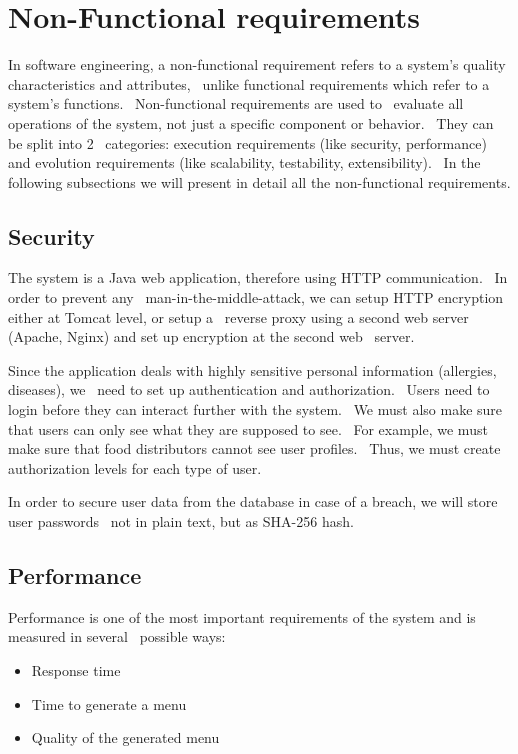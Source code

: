 \section{Non-Functional requirements}
\label{sec:specification-non-functional}
In software engineering, a non-functional requirement refers to a system's quality characteristics and attributes, \
unlike functional requirements which refer to a system's functions. \
Non-functional requirements are used to \
evaluate all operations of the system, not just a specific component or behavior. \
They can be split into 2 \
categories: execution requirements (like security, performance) and evolution requirements (like scalability,
testability, extensibility). \
In the following subsections we will present in detail all the non-functional requirements.

\subsection{Security}
\label{subsec:specification-security}
The system is a Java web application, therefore using HTTP communication. \
In order to prevent any \
man-in-the-middle-attack, we can setup HTTP encryption either at Tomcat level, or setup a \
reverse proxy using a second web server (Apache, Nginx) and set up encryption at the second web \
server.

Since the application deals with highly sensitive personal information (allergies, diseases), we \
need to set up authentication and authorization. \
Users need to login before they can interact further with the system. \
We must also make sure that users can only see what they are supposed to see. \
For example, we must make sure that food distributors cannot see user profiles. \
Thus, we must create authorization levels for each type of user.

In order to secure user data from the database in case of a breach, we will store user passwords \
not in plain text, but as SHA-256 hash.

\subsection{Performance}
\label{subsec:specification-performance}
Performance is one of the most important requirements of the system and is measured in several \
possible ways:
\begin{itemize}
    \item Response time
    \item Time to generate a menu
    \item Quality of the generated menu
\end{itemize}

